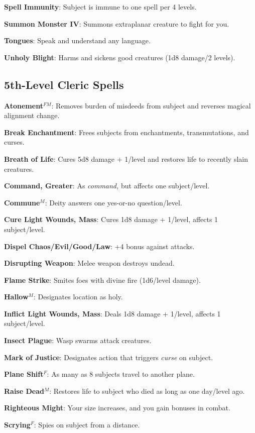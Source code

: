 \textbf{Spell Immunity}: Subject is immune to one spell per 4 levels.

\textbf{Summon Monster IV}: Summons extraplanar creature to fight for you.

\textbf{Tongues}: Speak and understand any language.

\textbf{Unholy Blight}: Harms and sickens good creatures (1d8 damage/2 levels).

\subsection{5th-Level Cleric Spells}


\textbf{Atonement}\(^{FM}\): Removes burden of misdeeds from subject and reverses magical alignment change.

\textbf{Break Enchantment}: Frees subjects from enchantments, transmutations, and curses.

\textbf{Breath of Life}: Cures 5d8 damage + 1/level and restores life to recently slain creatures.

\textbf{Command, Greater}: As \textit{command, }but affects one subject/level.

\textbf{Commune}\(^{M}\): Deity answers one yes-or-no question/level.

\textbf{Cure Light Wounds, Mass}: Cures 1d8 damage + 1/level, affects 1 subject/level.

\textbf{Dispel Chaos/Evil/Good/Law}: +4 bonus against attacks.

\textbf{Disrupting Weapon}: Melee weapon destroys undead.

\textbf{Flame Strike}: Smites foes with divine fire (1d6/level damage).

\textbf{Hallow}\(^{M}\): Designates location as holy.

\textbf{Inflict Light Wounds, Mass}: Deals 1d8 damage + 1/level, affects 1 subject/level.

\textbf{Insect Plague}: Wasp swarms attack creatures.

\textbf{Mark of Justice}: Designates action that triggers \textit{curse }on subject.

\textbf{Plane Shift}\(^{F}\): As many as 8 subjects travel to another plane.

\textbf{Raise Dead}\(^{M}\): Restores life to subject who died as long as one day/level ago.

\textbf{Righteous Might}: Your size increases, and you gain bonuses in combat.

\textbf{Scrying}\(^{F}\): Spies on subject from a distance.

